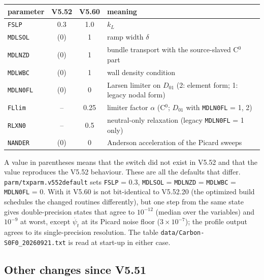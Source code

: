 \documentclass[11pt]{article}
\def\psit{\psi_t}
\def\psitd{\dot{\psit}}
\begin{document}
\begin{center}
\begin{tabular}{|l|c|c|l|}\hline
parameter & V5.52 & V5.60 & meaning \\\hline
\texttt{FSLP}    & 0.3 & 1.0 & $k_L$ \\
\texttt{MDLSOL}  & (0) & 1   & ramp width $\delta$ \\
\texttt{MDLNZD}  & (0) & 1   & bundle transport with the source-slaved C$^0$ part \\
\texttt{MDLWBC}  & (0) & 1   & wall density condition \\
\texttt{MDLN0FL} & (0) & 0   & Larsen limiter on $D_{01}$ (2: element form; 1: legacy nodal form) \\
\texttt{FLlim}   & --  & 0.25 & limiter factor $\alpha$ (C$^0$; $D_{01}$ with \texttt{MDLN0FL} = 1, 2) \\
\texttt{RLXN0}   & --  & 0.5 & neutral-only relaxation (legacy \texttt{MDLN0FL} = 1 only) \\
\texttt{NANDER}  & (0) & 0   & Anderson acceleration of the Picard sweeps \\\hline
\end{tabular}
\end{center}

A value in parentheses means that the switch did not exist in V5.52 and that
the value reproduces the V5.52 behaviour.  These are all the defaults that differ.
\texttt{parm/txparm.v552default} sets
\texttt{FSLP} = 0.3, \texttt{MDLSOL} = \texttt{MDLNZD} = \texttt{MDLWBC} =
\texttt{MDLN0FL} = 0.  With it V5.60 is not bit-identical to V5.52.20 (the
optimized build schedules the changed routines differently), but one step from
the same state gives double-precision states that agree to $10^{-12}$ (median
over the variables) and $10^{-9}$ at worst, except $\psitd$ at its Picard noise
floor ($3\times10^{-7}$); the profile output agrees to its single-precision
resolution.  The table \texttt{data/Carbon-S0F0\_20260921.txt} is read at start-up in
either case.

\subsection{Other changes since V5.51}
\label{sec:v552other}
\end{document}
